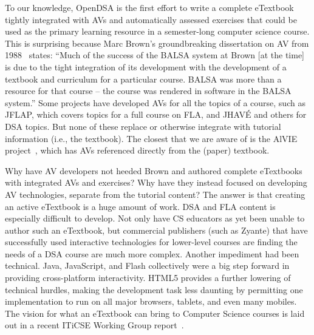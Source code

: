 \documentclass[11pt]{article}
\begin{document}
To our knowledge, OpenDSA is the first effort to write a complete
eTextbook tightly integrated with AVs and automatically
assessed exercises that could be used as the primary learning resource
in a semester-long computer science course.
This is surprising because Marc Brown's groundbreaking
dissertation on AV from 1988~\cite{Brow:1988} states:
``Much of the success of the BALSA system at Brown [at the time] is
due to the tight integration of its development with the development
of a textbook and curriculum for a particular course.
BALSA was more than a resource for that course --
the course was rendered in software in the BALSA system.''
Some projects have developed AVs for all the topics of a course, such
as JFLAP, which covers topics for a full course on FLA,
and JHAV\'{E} and others for DSA topics.
But none of these replace or otherwise integrate with tutorial
information (i.e., the textbook).
The closest that we are aware of is the AlVIE project~\cite{Alvie},
which has AVs referenced directly from the (paper) textbook.

Why have AV developers not heeded Brown and
authored complete eTextbooks with integrated AVs and exercises?
Why have they instead focused on developing AV technologies, separate
from the tutorial content? 
The answer is that creating an active eTextbook is a huge amount of work.
DSA and FLA content is especially difficult to develop.
Not only have CS educators as yet been unable to  
author such an eTextbook, but commercial publishers (such as Zyante)
that have successfully used interactive technologies for lower-level
courses are finding the needs of a DSA course are much more complex.
Another impediment had been technical.
Java, JavaScript, and Flash collectively were a big step forward in
providing cross-platform interactivity.
HTML5 provides a further lowering of technical hurdles, making the
development task less daunting by permitting one implementation to run
on all major browsers, tablets, and even many mobiles.
The vision for what an eTextbook can bring to Computer Science courses
is laid out in a recent ITiCSE Working Group report~\cite{KorhonenWG13}.
\end{document}
